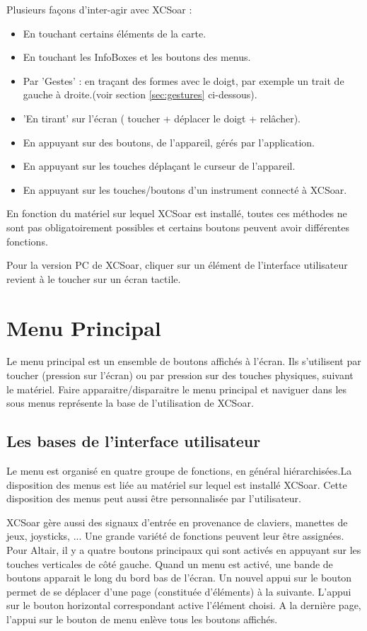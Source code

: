 Plusieurs façons d'inter-agir avec XCSoar :
\begin{itemize}
\item En touchant certains éléments de la carte.
\item En touchant les InfoBoxes et les boutons des menus.
\item Par 'Gestes' : en traçant des formes avec le doigt, par exemple un trait de gauche à droite.(voir section  \ref{sec:gestures} ci-dessous).
\item 'En tirant' sur l'écran ( toucher + déplacer le doigt + relâcher).
\item En appuyant sur des boutons, de l'appareil, gérés par l'application.
\item En appuyant sur les touches déplaçant le curseur de l'appareil.
\item En appuyant sur les touches/boutons d'un instrument connecté à XCSoar.
\end{itemize}
En fonction du matériel sur lequel XCSoar est installé, toutes ces méthodes ne sont pas obligatoirement possibles et certains boutons peuvent avoir différentes fonctions.

Pour la version PC de XCSoar, cliquer sur un élément de l'interface utilisateur revient à le toucher sur un écran tactile.

\section{Menu Principal}

Le menu principal est un ensemble de boutons affichés à l'écran. Ils s'utilisent par toucher (pression sur l'écran) ou par pression sur des touches physiques, suivant le matériel. Faire apparaitre/disparaitre le menu principal et naviguer dans les sous menus représente la base de l'utilisation de XCSoar.

\subsection*{Les bases de l'interface utilisateur}
Le menu est organisé en quatre groupe de fonctions, en général hiérarchisées.La disposition des menus est liée au matériel sur lequel est installé XCSoar. Cette disposition des menus peut aussi être personnalisée par l'utilisateur.

XCSoar gère aussi des signaux d'entrée en provenance de claviers, manettes de jeux, joysticks, ... Une grande variété de fonctions peuvent leur être assignées.
Pour Altair, il y a quatre boutons principaux qui sont activés en appuyant sur les touches verticales de côté gauche. Quand un menu est activé, une bande de boutons apparait le long du bord bas de l'écran. Un nouvel appui sur le bouton permet de se déplacer d'une page (constituée d'éléments) à la suivante. L'appui sur le bouton horizontal correspondant active l'élément choisi. A la dernière page, l'appui sur le bouton de menu enlève tous les boutons affichés.

